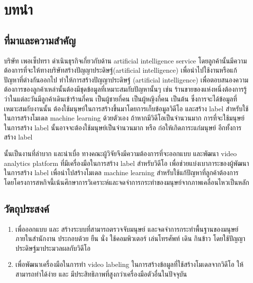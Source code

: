 \chapter{บทนำ}
\section{ที่มาและความสำคัญ}
บริษัท เพอเซ็ปทรา ดำเนินธุรกิจเกี่ยวกับด้าน artificial intelligence service โดยลูกค้านั้นมีความต้องการที่จะให้ทางบริษัทสร้างปัญญาประดิษฐ์(artificial intelligence) เพื่อนำไปใช้งานหรือแก้ปัญหาที่ต่างกันออกไป ทำให้การสร้างปัญญาประดิษฐ์ (artificial intelligence) เพื่อตอบสนองความต้องการของลูกค้าเหล่านั้นต้องมีชุดข้อมูลที่เหมาะสมกับปัญหานั้นๆ เช่น ร้านขายของแห่งหนึ่งต้องการรู้ว่าในแต่ละวันมีลูกค้าเดินเข้าร้านกี่คน เป็นผู้ชายกี่คน เป็นผู้หญิงกี่คน เป็นต้น ซึ่งการจะได้ข้อมูลที่เหมาะสมกับงานนั้น ต้องใช้มนุษย์ในการสร้างขึ้นมาโดยการเก็บข้อมูลวิดีโอ และสร้าง label สำหรับใช้ในการสร้างโมเดล machine learning ด้วยตัวเอง ถ้าหากมีวิดีโอเป็นจำนวนมาก การที่จะใช้มนุษย์ในการสร้าง label นั้นอาจจะต้องใช้มนุษย์เป็นจำนวนมาก หรือ ก่อให้เกิดภาระแก่มนุษย์ อีกทั้งการสร้าง label 

นั้นเป็นงานที่ลำบาก และน่าเบื่อ
ทางคณะผู้วิจัยจึงมีความต้องการที่จะออกแบบ และพัฒนา video analytics platform ที่มีเครื่องมือในการสร้าง label สำหรับวิดีโอ เพื่อช่วยแบ่งเบาภาระของผู้พัฒนาในการสร้าง label เพื่อนำไปสร้างโมเดล machine learning สำหรับใช้แก้ปัญหาที่ลูกค้าต้องการ โดยโครงการสหกิจนี้เน้นศึกษาการวิเคราะห์และจดจำการกระทำของมนุษย์จากภาพเคลื่อนไหวเป็นหลัก

\section{วัตถุประสงค์}
\begin{enumerate}[label=\arabic*, leftmargin=1.5cm]
	\setlength\itemsep{-0.25em}
	\item เพื่อออกแบบ และ สร้างระบบที่สามารถตรวจจับมนุษย์ และจดจำการกระทำพื้นฐานของมนุษย์ภายในสำนักงาน ประกอบด้วย ยืน นั่ง ใช้คอมพิวเตอร์ เล่นโทรศัพท์ เดิน กินข้าว โดยใช้ปัญญาประดิษฐ์มาประมวลผลกับวิดีโอ
	\item เพื่อพัฒนาเครื่องมือในการทำ video labeling ในการสร้างข้อมูลที่ใช้สร้างโมเดลจากวิดีโอ ให้สามารถทำได้ง่าย และ มีประสิทธิภาพที่สูงกว่าเครื่องมือตัวอื่นในปัจจุบัน
\end{enumerate}



